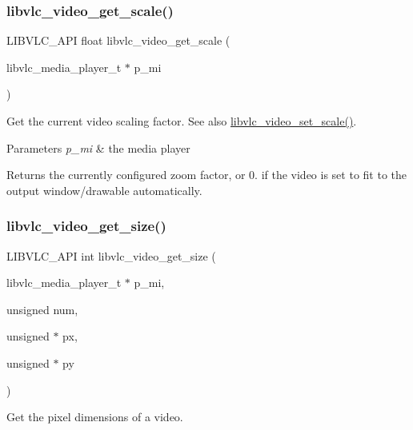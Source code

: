\subsubsection{\texorpdfstring{libvlc\+\_\+video\+\_\+get\+\_\+scale()}{libvlc\_video\_get\_scale()}}
{\footnotesize\ttfamily L\+I\+B\+V\+L\+C\+\_\+\+A\+PI float libvlc\+\_\+video\+\_\+get\+\_\+scale (\begin{DoxyParamCaption}\item[{libvlc\+\_\+media\+\_\+player\+\_\+t $\ast$}]{p\+\_\+mi }\end{DoxyParamCaption})}

Get the current video scaling factor. See also \hyperlink{group__libvlc__video_ga36dfdf93272e1085d9183394c8aef1be}{libvlc\+\_\+video\+\_\+set\+\_\+scale()}.


\begin{DoxyParams}{Parameters}
{\em p\+\_\+mi} & the media player \\
\hline
\end{DoxyParams}
\begin{DoxyReturn}{Returns}
the currently configured zoom factor, or 0. if the video is set to fit to the output window/drawable automatically. 
\end{DoxyReturn}
\mbox{\label{group__libvlc__video_ga3cb7efa452da1f718013da0f169396a7}} 
\subsubsection{\texorpdfstring{libvlc\+\_\+video\+\_\+get\+\_\+size()}{libvlc\_video\_get\_size()}}
{\footnotesize\ttfamily L\+I\+B\+V\+L\+C\+\_\+\+A\+PI int libvlc\+\_\+video\+\_\+get\+\_\+size (\begin{DoxyParamCaption}\item[{libvlc\+\_\+media\+\_\+player\+\_\+t $\ast$}]{p\+\_\+mi,  }\item[{unsigned}]{num,  }\item[{unsigned $\ast$}]{px,  }\item[{unsigned $\ast$}]{py }\end{DoxyParamCaption})}

Get the pixel dimensions of a video.


